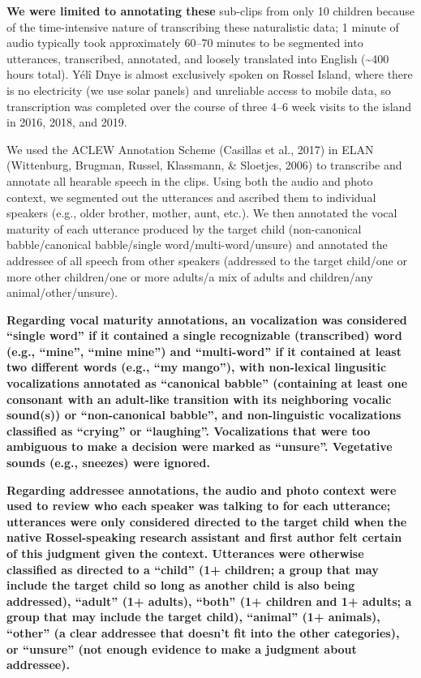 \documentclass[,man,floatsintext]{apa6}
\begin{document}
\textbf{We were limited to annotating these} sub-clips from only 10
children because of the time-intensive nature of transcribing these
naturalistic data; 1 minute of audio typically took approximately 60--70
minutes to be segmented into utterances, transcribed, annotated, and
loosely translated into English (\textasciitilde{}400 hours total). Yélî
Dnye is almost exclusively spoken on Rossel Island, where there is no
electricity (we use solar panels) and unreliable access to mobile data,
so transcription was completed over the course of three 4--6 week visits
to the island in 2016, 2018, and 2019.

We used the ACLEW Annotation Scheme (Casillas et al., 2017) in ELAN
(Wittenburg, Brugman, Russel, Klassmann, \& Sloetjes, 2006) to
transcribe and annotate all hearable speech in the clips. Using both the
audio and photo context, we segmented out the utterances and ascribed
them to individual speakers (e.g., older brother, mother, aunt, etc.).
We then annotated the vocal maturity of each utterance produced by the
target child (non-canonical babble/canonical babble/single
word/multi-word/unsure) and annotated the addressee of all speech from
other speakers (addressed to the target child/one or more other
children/one or more adults/a mix of adults and children/any
animal/other/unsure).

\textbf{Regarding vocal maturity annotations, an vocalization was
considered \enquote{single word} if it contained a single recognizable
(transcribed) word (e.g., \enquote{mine}, \enquote{mine mine}) and
\enquote{multi-word} if it contained at least two different words (e.g.,
\enquote{my mango}), with non-lexical lingusitic vocalizations annotated
as \enquote{canonical babble} (containing at least one consonant with an
adult-like transition with its neighboring vocalic sound(s)) or
\enquote{non-canonical babble}, and non-linguistic vocalizations
classified as \enquote{crying} or \enquote{laughing}. Vocalizations that
were too ambiguous to make a decision were marked as \enquote{unsure}.
Vegetative sounds (e.g., sneezes) were ignored.}

\textbf{Regarding addressee annotations, the audio and photo context
were used to review who each speaker was talking to for each utterance;
utterances were only considered directed to the target child when the
native Rossel-speaking research assistant and first author felt certain
of this judgment given the context. Utterances were otherwise classified
as directed to a \enquote{child} (1+ children; a group that may include
the target child so long as another child is also being addressed),
\enquote{adult} (1+ adults), \enquote{both} (1+ children and 1+ adults;
a group that may include the target child), \enquote{animal} (1+
animals), \enquote{other} (a clear addressee that doesn't fit into the
other categories), or \enquote{unsure} (not enough evidence to make a
judgment about addressee).}
\end{document}
